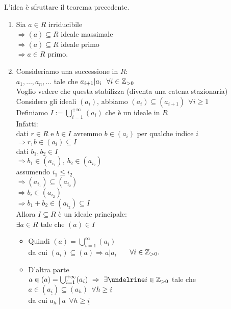 \documentclass[12px]{article}
\begin{document}
	  \begin{dimo}
	  	L'idea è sfruttare il teorema precedente.
		\begin{enumerate}
			\item Sia $a\in R$ irriducibile\\
				 $ \Rightarrow (a)\subseteq R$ ideale massimale\\
				 $ \Rightarrow (a)\subseteq R$ ideale primo\\
				 $ \Rightarrow a\in R$ primo.
			 \item Consideriamo una successione in $ R$:\\
				 $a_1,\ldots,a_n,\ldots$ tale che $a_{i+1} | a_i \ \ \forall i\in \mathbb{Z}_{>0}$\\
				 Voglio vedere che questa stabilizza (diventa una catena stazionaria)\\
				 Considero gli ideali  $(a_i)$, abbiamo  $(a_i)\subseteq (a_{i+1}) \ \ \forall i\geq 1$\\
				 Definiamo  $I:= \bigcup_{i=1}^{+\infty}(a_i)$ che è un ideale in $R$ \\
				 Infatti:\\
				 dati $r\in R$ e  $b\in I$ avremmo $b\in (a_i)$ per qualche indice $i$ \\
				 $ \Rightarrow r,b\in(a_i)\subseteq I$ \\[10px]
				 dati $b_1,b_2\in I$ \\
				 $ \Rightarrow b_1\in(a_{i_1}), \ b_2\in (a_{i_2})$ \\
				 assumendo $i_1\leq i_2$ \\
				 $ \Rightarrow (a_{i_1})\subseteq (a_{i_2})$ \\
				 $ \Rightarrow b_i\in(a_{i_2})$ \\
				 $ \Rightarrow b_1 + b_2\in (a_{i_2})\subseteq I$ \\[10px]
				 Allora $I\subseteq R$ è un ideale principale:\\
				  $\exists a\in R$ tale che $(a)\in I$
				  \begin{itemize}
					  \item 
				  Quindi  $(a) = \bigcup^{\infty}_{i=1}(a_i)$ \\
				  da cui $(a_i)\subseteq (a) \Rightarrow a | a_i$ \ \ \ $\forall i\in \mathbb{Z}_{>0} .$
			  \item D'altra parte \\
				  $a\in (a) = \bigcup^{+\infty}_{i=1}(a_i)\ \Rightarrow \ \exists \undelrine i \in \Z_{>0} $ tale che $a\in (a_{\underline i })\subseteq (a_h) \ \ \forall h\geq \underline i$ \\
				  da cui $a_h \ | \ a \ \ \forall h\geq \underline i $


\end{itemize}
\end{enumerate}
\end{dimo}
\end{document}
